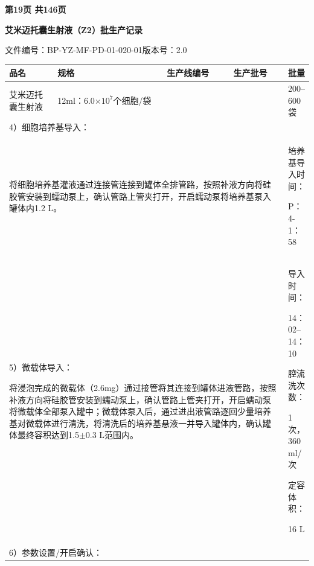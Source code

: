\documentclass[UTF8,10pt,a4paper,fontset=fandol]{ctexart}
\newcommand{\fieldvalue}[1]{#1}
\newcommand{\handwritten}[1]{#1}
\begin{document}
\noindent
\textbf{第19页 共146页}

\newpage

\begin{center}
\textbf{艾米迈托囊生射液（Z2）批生产记录}
\end{center}

\noindent
文件编号：BP-YZ-MF-PD-01-020-01\quad 版本号：2.0

\begin{tabular}{|p{0.16\linewidth}|p{0.36\linewidth}|p{0.22\linewidth}|p{0.18\linewidth}|p{0.12\linewidth}|}
\hline
品名 & 规格 & 生产线编号 & 生产批号 & 批量\\
\hline
艾米迈托囊生射液 & 12ml：6.0$\times 10^{7}$个细胞/袋 & & & 200--600袋\\
\hline
\multicolumn{5}{|l|}{4）细胞培养基导入：}\\
\multicolumn{4}{|p{0.74\linewidth}|}{
将细胞培养基灌液通过连接管连接到罐体全排管路，按照补液方向将硅胶管安装到蠕动泵上，确认管路上管夹打开，开启蠕动泵将培养基泵入罐体内1.2 L。
}
&
\begin{minipage}[t]{0.18\linewidth}
培养基导入时间：

\fieldvalue{\handwritten{P：4-1：58}}
\end{minipage}
\\
\hline
\multicolumn{4}{|p{0.74\linewidth}|}{
5）微载体导入：

将浸泡完成的微载体（2.6mg）通过接管将其连接到罐体进液管路，按照补液方向将硅胶管安装到蠕动泵上，确认管路上管夹打开，开启蠕动泵将微载体全部泵入罐中；微载体泵入后，通过进出液管路逐回少量培养基对微载体进行清洗，将清洗后的培养基悬液一并导入罐体内，确认罐体最终容积达到1.5$\pm$0.3 L范围内。
}
&
\begin{minipage}[t]{0.18\linewidth}
导入时间：

\fieldvalue{\handwritten{14：02--14：10}}

腔流洗次数：

\fieldvalue{\handwritten{1}} 次，\quad
\fieldvalue{\handwritten{360}} ml/次

定容体积：

\fieldvalue{\handwritten{16}} L
\end{minipage}
\\
\hline
\multicolumn{4}{|p{0.74\linewidth}|}{
6）参数设置/开启确认：

}
\end{tabular}
\end{document}
